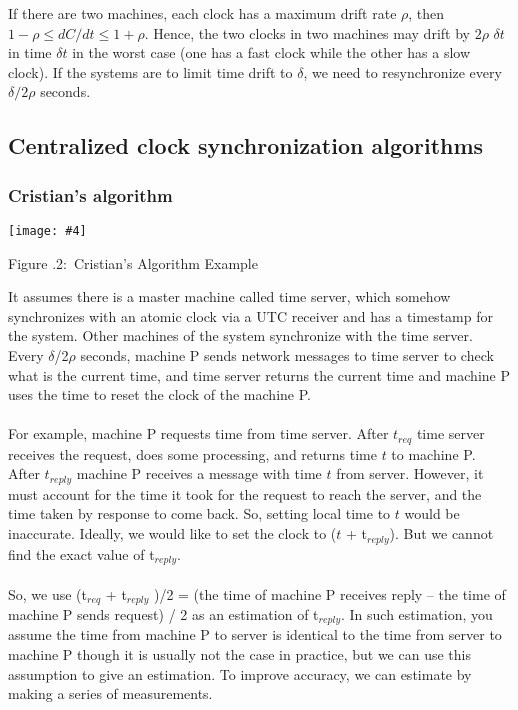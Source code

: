 \documentclass[twoside]{article}
\newcounter{lecnum}
\newcommand{\fig}[4]{
            \centerline{\texttt{[image: \#4]}}
            \begin{center}
            Figure \thelecnum.#1:~#3
            \end{center}
    }
\begin{document}
If there are two machines, each clock has a maximum drift rate $\rho$, then $1 - \rho \leq dC/dt \leq 1 + \rho$. Hence, the two clocks in two machines may drift by $2\rho$ $\delta t$ in time $\delta t$ in the worst case (one has a fast clock while the other has a slow clock). If the systems are to limit time drift to $\delta$, we need to resynchronize every $\delta/2\rho$ seconds.


\subsection{Centralized clock synchronization algorithms}
\subsubsection{Cristian’s algorithm}

\fig{2}{0.5}{Cristian's Algorithm Example}{../Pictures/cris.png}

It assumes there is a master machine called time server, which somehow synchronizes with an atomic clock via a UTC receiver and has a timestamp for the system. Other machines of the system synchronize with the time server. Every $\delta$/2$\rho$ seconds, machine P sends network messages to time server to check what is the current time, and time server returns the current time and machine P uses the time to reset the clock of the machine P. \\\\
For example, machine P requests time from time server. After $t_{req}$ time server receives the request, does some processing, and returns time $t$ to machine P. After  $t_{reply}$ machine P receives a message with time $t$ from server. However, it must account for the time it took for the request to reach the server, and the time taken by response to come back. So, setting local time to $t$ would be inaccurate. Ideally, we would like to set the clock to ($t$ + t$_{reply}$). But we cannot find the exact value of t$_{reply}$.\\\\
So, we use (t$_{req}$ + t$_{reply}$ )/2 = (the time of machine P receives reply – the time of machine P sends request) / 2 as an estimation of t$_{reply}$. In such estimation, you assume the time from machine P to server is identical to the time from server to machine P though it is usually not the case in practice, but we can use this assumption to give an estimation. To improve accuracy, we can estimate by making a series of measurements.
\end{document}
